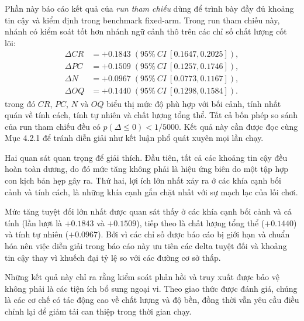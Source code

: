 ﻿\documentclass[a4paper,12pt]{article}
\newcommand{\BootstrapSamples}{5000}
\begin{document}
Phần này báo cáo kết quả của \emph{run tham chiếu} dùng để trình bày đầy đủ khoảng tin cậy và kiểm định trong benchmark fixed-arm. Trong run tham chiếu này, nhánh có kiểm soát tốt hơn nhánh ngữ cảnh thô trên các chỉ số chất lượng cốt lõi:
\begin{equation*}
\begin{aligned}
\Delta CR &= +0.1843\; (95\%\ CI\ [0.1647,0.2025]),\\
\Delta PC &= +0.1509\; (95\%\ CI\ [0.1257,0.1746]),\\
\Delta N  &= +0.0967\; (95\%\ CI\ [0.0773,0.1167]),\\
\Delta OQ &= +0.1440\; (95\%\ CI\ [0.1298,0.1584]).
\end{aligned}
\end{equation*}
trong đó \(CR\), \(PC\), \(N\) và \(OQ\) biểu thị mức độ phù hợp với bối cảnh, tính nhất quán về tính cách, tính tự nhiên và chất lượng tổng thể. Tất cả bốn phép so sánh của run tham chiếu đều có \(p(\Delta\le 0)<1/\BootstrapSamples\). Kết quả này cần được đọc cùng Mục 4.2.1 để tránh diễn giải như kết luận phổ quát xuyên mọi lần chạy.

Hai quan sát quan trọng để giải thích. Đầu tiên, tất cả các khoảng tin cậy đều hoàn toàn dương, do đó mức tăng không phải là hiệu ứng biên do một tập hợp con kịch bản hẹp gây ra. Thứ hai, lợi ích lớn nhất xảy ra ở các khía cạnh bối cảnh và tính cách, là những khía cạnh gắn chặt nhất với sự mạch lạc của lối chơi.

Mức tăng tuyệt đối lớn nhất được quan sát thấy ở các khía cạnh bối cảnh và cá tính (lần lượt là \(+0.1843\) và \(+0.1509\)), tiếp theo là chất lượng tổng thể (\(+0.1440\)) và tính tự nhiên (\(+0.0967\)). Bởi vì các chỉ số được báo cáo bị giới hạn và chuẩn hóa nên việc diễn giải trong báo cáo này ưu tiên các delta tuyệt đối và khoảng tin cậy thay vì khuếch đại tỷ lệ so với các đường cơ sở thấp.

Những kết quả này chỉ ra rằng kiểm soát phản hồi và truy xuất được bảo vệ không phải là các tiện ích bổ sung ngoại vi. Theo giao thức được đánh giá, chúng là các cơ chế có tác động cao về chất lượng và độ bền, đồng thời vẫn yêu cầu điều chỉnh lại để giảm tải can thiệp trong thời gian chạy.
\end{document}
